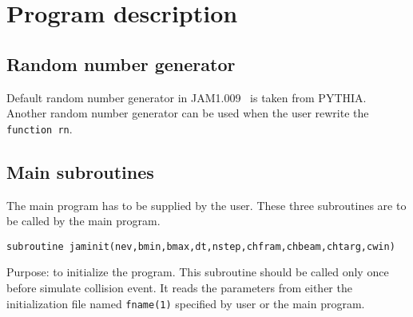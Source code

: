 \documentclass[]{article}
\def\VERSION{1.009}
\newenvironment{entry}%
{\begin{list}{}{\setlength{\topsep}{0mm} \setlength{\itemsep}{0mm}
\setlength{\parskip}{0mm} \setlength{\parsep}{0mm}
\setlength{\leftmargin}{20mm} \setlength{\rightmargin}{0mm}
\setlength{\labelwidth}{18mm} \setlength{\labelsep}{2mm}}}%
{\end{list}}
\newcommand{\itemt}[1]{\item[{\tt #1}\hfill]}
\begin{document}
\section{Program description}


\subsection{Random number generator}
Default random number generator in JAM\VERSION~ is
taken from PYTHIA. Another random number generator can be used
when the user rewrite the {\tt function rn}.

\subsection{Main subroutines}

The main program has to be supplied by the user.
These three subroutines are to be called by the main program.
\begin{entry}
\itemt{subroutine jaminit(nev,bmin,bmax,dt,nstep,chfram,chbeam,chtarg,cwin)}
\itemt{subroutine jamevt(iev)}
\itemt{subroutine jamfin}
\end{entry}



\begin{verbatim}
subroutine jaminit(nev,bmin,bmax,dt,nstep,chfram,chbeam,chtarg,cwin)
\end{verbatim}
Purpose: to initialize the program.
This subroutine should be called only once before simulate collision event.
 It reads the parameters
from either the initialization file named {\tt fname(1)} specified by user
or the main program.
\medskip
\end{document}
